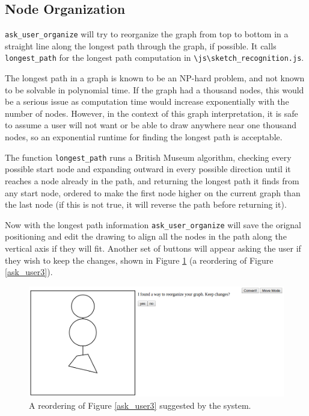 \documentclass[12pt]{article}
\begin{document}
\subsection{Node Organization}
\par \texttt{ask\_user\_organize} will try to reorganize the graph from top to bottom in a straight line along the longest path through the graph, if possible. It calls \texttt{longest\_path} for the longest path computation in \texttt{\textbackslash js\textbackslash sketch\_recognition.js}.\\

\par The longest path in a graph is known to be an NP-hard problem, and not known to be solvable in polynomial time. If the graph had a thousand nodes, this would be a serious issue as computation time would increase exponentially with the number of nodes. However, in the context of this graph interpretation, it is safe to assume a user will not want or be able to draw anywhere near one thousand nodes, so an exponential runtime for finding the longest path is acceptable.\\

\par The function \texttt{longest\_path} runs a British Museum algorithm, checking every possible start node and expanding outward in every possible direction until it reaches a node already in the path, and returning the longest path it finds from any start node, ordered to make the first node higher on the current graph than the last node (if this is not true, it will reverse the path before returning it).\\

\par Now with the longest path information \texttt{ask\_user\_organize} will save the orignal positioning and edit the drawing to align all the nodes in the path along the vertical axis if they will fit. Another set of buttons will appear asking the user if they wish to keep the changes, shown in Figure \ref{reorder} (a reordering of Figure \ref{ask_user3}).

\begin{figure}
\includegraphics[width=\textwidth]{reorder.png}
\caption{A reordering of Figure \ref{ask_user3} suggested by the system.}
\label{reorder}
\end{figure}
\end{document}
